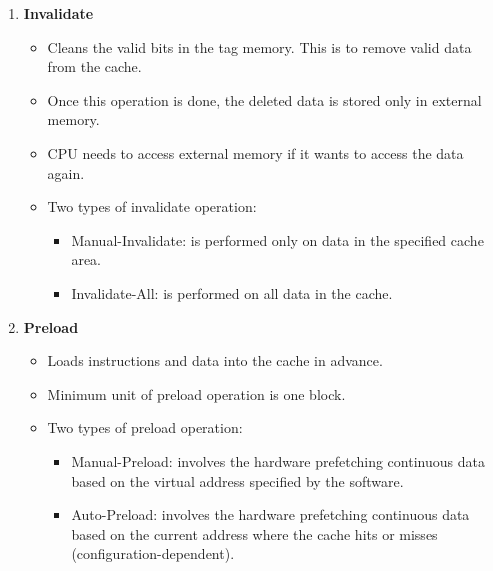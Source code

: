 \documentclass[main\_\_EN.tex]{subfiles}
\begin{document}
\begin{enumerate}
\item \textbf{Invalidate}
\begin{itemize}
    \item Cleans the valid bits in the tag memory. This is to remove valid data from the cache.
    \item Once this operation is done, the deleted data is stored only in external memory.
    \item CPU needs to access external memory if it wants to access the data again.
    \item Two types of invalidate operation:
    \begin{itemize}
    \item Manual-Invalidate: is performed only on data in the specified cache area.
    \item Invalidate-All: is performed on all data in the cache.
    \end{itemize}
\end{itemize}

\item \textbf{Preload}
\begin{itemize}
    \item Loads instructions and data into the cache in advance.
    \item Minimum unit of preload operation is one block.
    \item Two types of preload operation:
    \begin{itemize}
    \item Manual-Preload: involves the hardware prefetching continuous data based on the virtual address specified by the software.
    \item Auto-Preload: involves the hardware prefetching continuous data based on the current address where the cache hits or misses (configuration-dependent).
    \end{itemize}
\end{itemize}


\end{enumerate}
\end{document}
